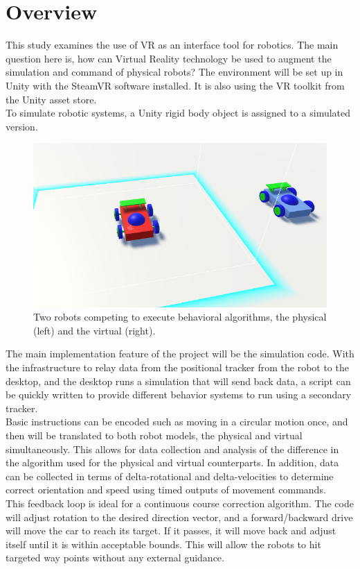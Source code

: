 \documentclass[10pt,a4paper]{article}
\begin{document}
	\section*{Overview}
	This study examines the use of VR as an interface tool for robotics. The main question here is, how can Virtual Reality technology be used to augment the simulation and command of physical robots? The environment will be set up in Unity with the SteamVR software installed. It is also using the VR toolkit from the Unity asset store.
	\\ 
	To simulate robotic systems, a Unity rigid body object is assigned to a simulated version. 		\begin{figure}[h]
		\centering
		\includegraphics[width=.4\textwidth]{robot-rivalry.png}
		\caption{Two robots competing to execute behavioral algorithms, the physical (left) and the virtual (right).}
		\label{fig:robot-rivalry}
	\end{figure}
	The main implementation feature of the project will be the simulation code. With the infrastructure to relay data from the positional tracker from the robot to the desktop, and the desktop runs a simulation that will send back data, a script can be quickly written to provide different behavior systems to run using a secondary tracker.
	\\ 
	Basic instructions can be encoded such as moving in a circular motion once, and then will be translated to both robot models, the physical and virtual simultaneously. This allows for data collection and analysis of the difference in the algorithm used for the physical and virtual counterparts. In addition, data can be collected in terms of delta-rotational and delta-velocities to determine correct orientation and speed using timed outputs of movement commands.
	\\ 
	This feedback loop is ideal for a continuous course correction algorithm. The code will adjust rotation to the desired direction vector, and a forward/backward drive will move the car to reach its target. If it passes, it will move back and adjust itself until it is within acceptable bounds. This will allow the robots to hit targeted way points without any external guidance.
	\\ 
\end{document}
